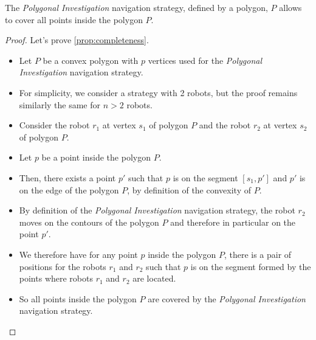 \begin{proposition}[Completeness]
	The \textit{Polygonal Investigation} navigation strategy, defined by a polygon, $P$ allows to cover all points inside the polygon $P$.
	\label{prop:completeness}
\end{proposition}
\begin{proof}
	Let's prove \ref{prop:completeness}.
	\begin{itemize}
		\item Let $P$ be a convex polygon with $p$ vertices used for the \textit{Polygonal Investigation} navigation strategy.
		\item For simplicity, we consider a strategy with 2 robots, but the proof remains similarly the same for $n > 2$ robots.
		\item Consider the robot $r_1$ at vertex $s_1$ of polygon $P$ and the robot $r_2$ at vertex $s_2$ of polygon $P$.
		\item Let $p$ be a point inside the polygon $P$.
		\item Then, there exists a point $p'$ such that $p$ is on the segment $[s_1, p']$ and $p'$ is on the edge of the polygon $P$, by definition of the convexity of $P$.
		\item By definition of the \textit{Polygonal Investigation} navigation strategy, the robot $r_2$ moves on the contours of the polygon $P$ and therefore in particular on the point $p'$.
		\item We therefore have for any point $p$ inside the polygon $P$, there is a pair of positions for the robots $r_1$ and $r_2$ such that $p$ is on the segment formed by the points where robots $r_1$ and $r_2$ are located.
		\item So all points inside the polygon $P$ are covered by the \textit{Polygonal Investigation} navigation strategy.
	\end{itemize}
\end{proof}

